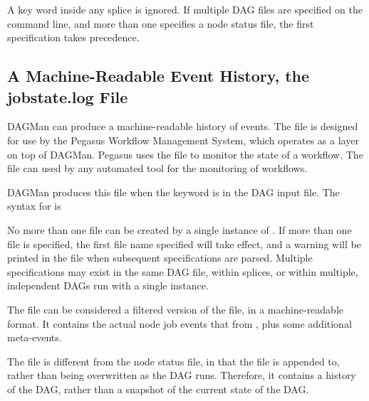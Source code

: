 A  key word inside any splice is ignored.
If multiple DAG files are specified on the  command line,
and more than one specifies a node status file,
the first specification takes precedence.

\subsection{\label{sec:DAGJobstateLog}A Machine-Readable Event History, the jobstate.log File}

DAGMan can produce a machine-readable history of events.
The  file is designed for use by the Pegasus Workflow
Management System, which operates as a layer on top of DAGMan.  Pegasus
uses the  file to monitor the state of a workflow.
The  file can used by any
automated tool for the monitoring of workflows.

DAGMan produces this file when the keyword  is
in the DAG input file.
The syntax for  is

 

No more than one  file can be created by a single
instance of .
If more than one  file is specified,
the first file name specified will take effect,
and a warning will be printed in the  file
when subsequent  specifications are parsed.
Multiple specifications may exist in the same DAG file, within splices,
or within multiple, independent DAGs run with a single  instance.

The  file can be considered a filtered
version of the  file, in a machine-readable format.
It contains the actual node job events that from ,
plus some additional meta-events.

The  file is different from the node status file,
in that the  file is appended to,
rather than being overwritten as the DAG runs.
Therefore, it contains a history of the DAG,
rather than a snapshot of the current state of the DAG.

